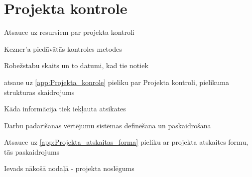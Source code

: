 \section{Projekta kontrole}
Atsauce uz resursiem par projekta kontroli
\par
Kezner'a piedāvātās kontroles metodes
\par
Robežstabu skaits un to datumi, kad tie notiek
\par
atsaue uz \ref{app:Projekta_konrole} pieliku par Projekta kontroli, pielikuma strukturas skaidrojums
\par
Kāda informācija tiek iekļauta atsikates
\par
Darbu padarīšanas vērtējumu sistēmas definēšana un paskaidrošana
\par
Atsauce uz \ref{app:Projekta_atskaitas_forma} pieliku ar projekta atskaites formu, tās paskaidrojums
\par
Ievads nākošā nodaļā - projekta noslēgums